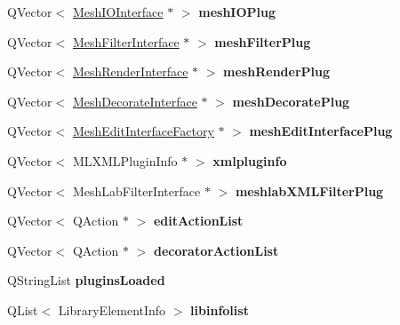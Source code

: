 \begin{DoxyCompactItemize}
Q\+Vector$<$ \hyperlink{class_mesh_i_o_interface}{Mesh\+I\+O\+Interface} $\ast$ $>$ {\bfseries mesh\+I\+O\+Plug}
\item 
\mbox{\label{class_plugin_manager_a097c531f4bfc589ccac8e297fc68daef}} 
Q\+Vector$<$ \hyperlink{class_mesh_filter_interface}{Mesh\+Filter\+Interface} $\ast$ $>$ {\bfseries mesh\+Filter\+Plug}
\item 
\mbox{\label{class_plugin_manager_a5e887d31183825cc6bec2cf5c4450eb6}} 
Q\+Vector$<$ \hyperlink{class_mesh_render_interface}{Mesh\+Render\+Interface} $\ast$ $>$ {\bfseries mesh\+Render\+Plug}
\item 
\mbox{\label{class_plugin_manager_a689abfcd2c7367e96816d46a4764f5e5}} 
Q\+Vector$<$ \hyperlink{class_mesh_decorate_interface}{Mesh\+Decorate\+Interface} $\ast$ $>$ {\bfseries mesh\+Decorate\+Plug}
\item 
\mbox{\label{class_plugin_manager_afa398abc7f98d0db1831fc993e29281a}} 
Q\+Vector$<$ \hyperlink{class_mesh_edit_interface_factory}{Mesh\+Edit\+Interface\+Factory} $\ast$ $>$ {\bfseries mesh\+Edit\+Interface\+Plug}
\item 
\mbox{\label{class_plugin_manager_ac96881fd5c3abba3ec06bc44ec006b81}} 
Q\+Vector$<$ M\+L\+X\+M\+L\+Plugin\+Info $\ast$ $>$ {\bfseries xmlpluginfo}
\item 
\mbox{\label{class_plugin_manager_a21a42f677c5d5b0f209634d33ca07c57}} 
Q\+Vector$<$ Mesh\+Lab\+Filter\+Interface $\ast$ $>$ {\bfseries meshlab\+X\+M\+L\+Filter\+Plug}
\item 
\mbox{\label{class_plugin_manager_a6daa4e44342c860c8374f9759ee9d54a}} 
Q\+Vector$<$ Q\+Action $\ast$ $>$ {\bfseries edit\+Action\+List}
\item 
\mbox{\label{class_plugin_manager_adc858445c702fc027ac41d278c5b0e65}} 
Q\+Vector$<$ Q\+Action $\ast$ $>$ {\bfseries decorator\+Action\+List}
\item 
\mbox{\label{class_plugin_manager_accf4f00889efdf1dbe1fdb7bc825b9aa}} 
Q\+String\+List {\bfseries plugins\+Loaded}
\item 
\mbox{\label{class_plugin_manager_ae58dafa6d14ae7057da4f63d49c88de5}} 
Q\+List$<$ Library\+Element\+Info $>$ {\bfseries libinfolist}
\end{DoxyCompactItemize}


